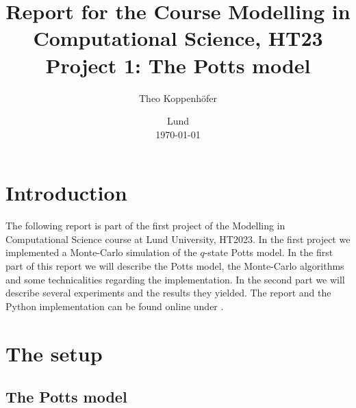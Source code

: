 




\title{ Report for the Course Modelling in Computational Science, HT23 \\[1ex]
	  \large Project 1: The Potts model}
\author{Theo Koppenhöfer}
\date{Lund \\[1ex] \today}



\usepackage{pythonhighlight}
\usepackage{pgfplots}
\graphicspath{{../Figures/}}






\maketitle

\section{Introduction}

The following report is part of the first project of the Modelling in Computational Science course at Lund University, HT2023.
In the first project we implemented a Monte-Carlo simulation of the $q$-state Potts model. In the first part of this report we will describe the Potts model, the Monte-Carlo algorithms and some technicalities regarding the implementation. In the second part we will describe several experiments and the results they yielded.
The report and the Python implementation can be found online under \cite{Repository}.

\section{The setup}

\subsection{The Potts model}

